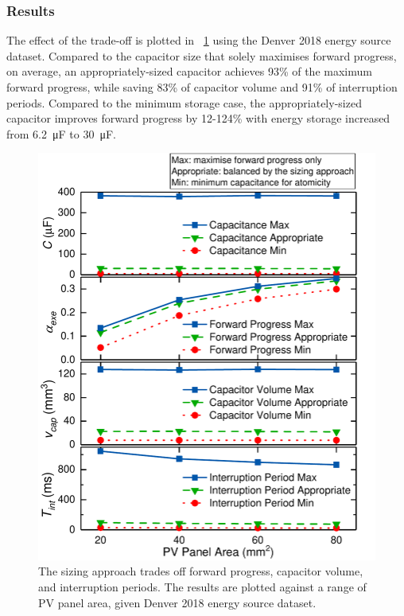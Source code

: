 \subsubsection{Results}

The effect of the trade-off is plotted in \figurename{~\ref{fig:tradeoff}} using the Denver 2018 energy source dataset. Compared to the capacitor size that solely maximises forward progress, on average, an appropriately-sized capacitor achieves 93\% of the maximum forward progress, while saving 83\% of capacitor volume and 91\% of interruption periods. Compared to the minimum storage case, the appropriately-sized capacitor improves forward progress by 12-124\% with energy storage increased from \SI{6.2}{\micro\farad} to \SI{30}{\micro\farad}.

\begin{figure}
    \centering
    \includegraphics[width=\columnwidth]{ch4_sizingapproach/figures/Tradeoff3Fig}
    \caption{The sizing approach trades off forward progress, capacitor volume, and interruption periods. The results are plotted against a range of PV panel area, given Denver 2018 energy source dataset. }
    \label{fig:tradeoff}
\end{figure}

